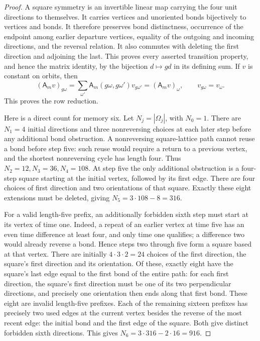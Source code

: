 \begin{proof}
A square symmetry is an invertible linear map carrying the four
unit directions to themselves. It carries vertices and unoriented
bonds bijectively to vertices and bonds. It therefore preserves
bond distinctness, occurrence of the endpoint among earlier
departure vertices, equality of the outgoing and incoming directions,
and the reversal relation. It also commutes with deleting the first
direction and adjoining the last. This proves every asserted
transition property, and hence the matrix identity, by the bijection
\(d\mapsto gd\) in its defining sum. If \(v\) is constant on orbits,
then
\[
 (\mathsf A_mv)_{g\omega}
 =\sum_{\omega'}\mathsf A_m(g\omega,g\omega')v_{g\omega'}
 =(\mathsf A_mv)_\omega ,\qquad v_{g\omega}=v_\omega .
\]
This proves the row reduction.

Here is a direct count for memory six. Let \(N_j=|\Omega_j|\),
with \(N_0=1\). There are \(N_1=4\) initial directions and
three nonreversing choices at each later step before any additional
bond obstruction. A nonreversing square-lattice path cannot reuse a
bond before step five: such reuse would require a return to a previous
vertex, and the shortest nonreversing cycle has length four.
Thus \(N_2=12,N_3=36,N_4=108\).
At step five the only additional obstruction is a four-step square
starting at the initial vertex, followed by its first edge. There
are four choices of first direction and two orientations of that
square. Exactly these eight extensions must be deleted, giving
\(N_5=3\cdot108-8=316\).

For a valid length-five prefix, an additionally forbidden sixth
step must start at its vertex of time one. Indeed, a repeat of an
earlier vertex at time five has an even time difference at least
four, and only time one qualifies; a difference two would already
reverse a bond. Hence steps two through five form a square based at
that vertex. There are initially \(4\cdot3\cdot2=24\) choices
of the first direction, the square's first direction and its
orientation. Of these, exactly eight have the square's last edge
equal to the first bond of the entire path: for each first
direction, the square's first direction must be one of its two
perpendicular directions, and precisely one orientation then ends
along that first bond. These eight are invalid length-five
prefixes. Each of the remaining sixteen prefixes has precisely two
used edges at the current vertex besides the reverse of the most
recent edge: the initial bond and the first edge of the square.
Both give distinct forbidden sixth directions. This gives
\(N_6=3\cdot316-2\cdot16=916\).


\end{proof}
